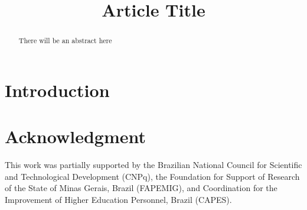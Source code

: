 \documentclass[conference]{IEEEtran}
\begin{document}
\title{Article Title}


\author{
\and
{}
}


\maketitle

\begin{abstract}
There will be an abstract here
\end{abstract}



\IEEEpeerreviewmaketitle

\section{Introduction} \label{sec:intro}

\section*{Acknowledgment}
This work was partially supported by 
the Brazilian National Council for Scientific and Technological Development (CNPq), 
the Foundation for Support of Research of the State of Minas Gerais, Brazil (FAPEMIG), and 
Coordination for the Improvement of Higher Education Personnel, Brazil (CAPES).



\end{document}
